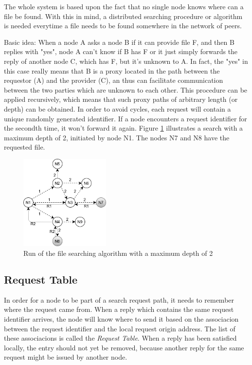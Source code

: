 The whole system is based upon the fact that no single node knows where can a 
file be found. With this in mind, a distributed searching procedure or 
algorithm is needed everytime a file needs to be found somewhere in the network 
of peers.

Basic idea: When a node A asks a node B if it can provide file F, and then B 
replies with "yes", node A can't know if B has F or it just simply forwards the 
reply of another node C, which has F, but it's unknown to A. In fact, the "yes" 
in this case really means that B is a proxy located in the path between the 
requestor (A) and the provider (C), an thus can facilitate communication 
between the two parties which are unknown to each other. This procedure can be 
applied recursively, which means that such proxy paths of arbitrary length (or 
depth) can be obtained. In order to avoid cycles, each request will contain a 
unique randomly generated identifier. If a node encounters a request identifier 
for the secondth time, it won't forward it again. Figure \ref{fig:fig4} 
illustrates a search with a maximum depth of 2, initiated by node N1. The nodes 
N7 and N8 have the requested file.

\begin{figure}
    \centering
    \includegraphics[width=0.4\textwidth]{figures/fig4}
    \caption{Run of the file searching algorithm with a maximum depth of 2}
    \label{fig:fig4}
\end{figure}

\subsection{Request Table}

In order for a node to be part of a search request path, it needs to remember 
where the request came from. When a reply which contains the same request 
identifier arrives, the node will know where to send it based on the 
associacion between the request identifier and the local request origin 
address. The list of these associacions is called the \textit{Request Table}. 
When a reply has been satisfied locally, the entry should not yet be removed, 
because another reply for the same request might be issued by another node.

